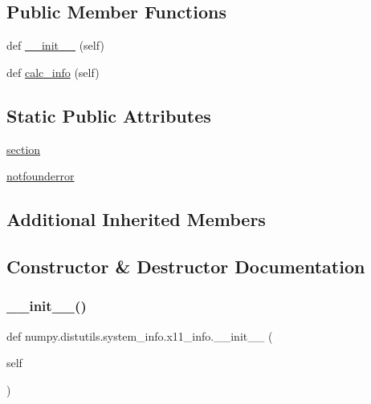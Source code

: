 \subsection*{Public Member Functions}
\begin{DoxyCompactItemize}
\item 
def \hyperlink{classnumpy_1_1distutils_1_1system__info_1_1x11__info_ab67d306ded495991980b53b672e52aab}{\+\_\+\+\_\+init\+\_\+\+\_\+} (self)
\item 
def \hyperlink{classnumpy_1_1distutils_1_1system__info_1_1x11__info_adbeea39db7fcd1f44de4221f8b8ce8b1}{calc\+\_\+info} (self)
\end{DoxyCompactItemize}
\subsection*{Static Public Attributes}
\begin{DoxyCompactItemize}
\item 
\hyperlink{classnumpy_1_1distutils_1_1system__info_1_1x11__info_a984461170221f16f2f38793206192ad2}{section}
\item 
\hyperlink{classnumpy_1_1distutils_1_1system__info_1_1x11__info_a91b39bb9a8a40b05d35ecd1883cdd392}{notfounderror}
\end{DoxyCompactItemize}
\subsection*{Additional Inherited Members}


\subsection{Constructor \& Destructor Documentation}
\mbox{\label{classnumpy_1_1distutils_1_1system__info_1_1x11__info_ab67d306ded495991980b53b672e52aab}} 
\subsubsection{\texorpdfstring{\+\_\+\+\_\+init\+\_\+\+\_\+()}{\_\_init\_\_()}}
{\footnotesize\ttfamily def numpy.\+distutils.\+system\+\_\+info.\+x11\+\_\+info.\+\_\+\+\_\+init\+\_\+\+\_\+ (\begin{DoxyParamCaption}\item[{}]{self }\end{DoxyParamCaption})}



